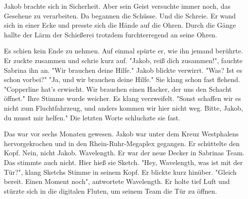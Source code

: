 \documentclass[a4paper, 10pt, twocolumn, twoside]{book}
\newcommand{\storypar}{
  \begin{center}
  \resizebox{3mm}{!}{$\textcolor{redtext}\ast$}
  \end{center}
}
\begin{document}
Jakob brachte sich in Sicherheit. Aber sein Geist versuchte immer noch, das Gesehene zu verarbeiten. Da begannen die Schüsse. Und die Schreie.
Er wand sich in einer Ecke und presste sich die Hände auf die Ohren. Durch die Gänge hallte der Lärm der Schießerei trotzdem furchterregend an seine Ohren.

Es schien kein Ende zu nehmen. Auf einmal spürte er, wie ihn jemand berührte. Er zuckte zusammen und schrie kurz auf.
"Jakob, reiß dich zusammen!", fauchte Sabrina ihn an. "Wir brauchen deine Hilfe."
Jakob blickte verwirrt. "Was? Ist es schon vorbei?"
"Ja, und wir brauchen deine Hilfe." Sie klang schon fast flehend. "Copperline hat’s erwischt. Wir brauchen einen Hacker, der uns den Schacht öffnet." Ihre Stimme wurde weicher. Es klang verzweifelt. "Sonst schaffen wir es nicht zum Fluchtfahrzeug, und anders kommen wir hier nicht weg. Bitte, Jakob, du musst mir helfen." Die letzten Worte schluchzte sie fast.
\storypar
Das war vor sechs Monaten gewesen. Jakob war unter dem Kreuz Westphalens hervorgekrochen und in den Rhein-Ruhr-Megaplex gegangen. Er schüttelte den Kopf. Nein, nicht Jakob. Wavelength. Er war der neue Decker in Sabrinas Team. Das stimmte auch nicht. Hier hieß sie Sketch.
"Hey, Wavelength, was ist mit der Tür?", klang Sketchs Stimme in seinem Kopf. Er blickte kurz hinüber.
"Gleich bereit. Einen Moment noch", antwortete Wavelength. Er holte tief Luft und stürzte sich in die digitalen Fluten, um seinem Team die Tür zu öffnen. 
\end{document}
